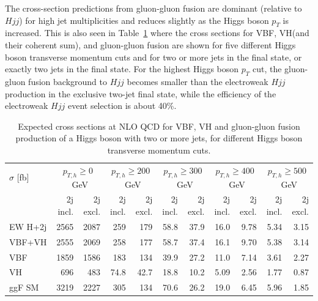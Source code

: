\documentclass[10pt,prd,fleqn,superscriptaddress,notitlepage,nofootinbib,preprintnumbers,nobalancelastpage]{revtex4-1}
\newcommand{\VBF}{VBF\xspace}
\newcommand{\VH}{VH\xspace}
\begin{document}
The cross-section predictions from gluon-gluon fusion are dominant (relative to $Hjj$) for high jet multiplicities and reduces slightly as the Higgs boson $p_T$ is increased.
This is also seen in Table~\ref{tab:incl_njets_fraction} where the cross sections for \VBF, \VH (and their coherent sum), and gluon-gluon fusion are shown for five different Higgs boson transverse momentum cuts and for two or more jets in the final state, or exactly two jets in the final state.
For the highest Higgs boson $p_T$ cut, the gluon-gluon fusion background to $Hjj$ becomes smaller than the electroweak $Hjj$ production in the exclusive two-jet final state, while the efficiency of the electroweak $Hjj$ event selection is about 40\%.

\begin{table}[t]
    \centering
    \bgroup
    \def\arraystretch{1.15}
    \setlength\tabcolsep{3mm}
    \begin{tabular}{l|rrrrrrrrrr}
        $\sigma$ [fb] & \multicolumn{2}{c}{$p_{T,h}\ge0$~GeV} & \multicolumn{2}{c}{$p_{T,h}\ge200$~GeV} & \multicolumn{2}{c}{$p_{T,h}\ge300$~GeV} & \multicolumn{2}{c}{$p_{T,h}\ge400$~GeV} & \multicolumn{2}{c}{$p_{T,h}\ge500$~GeV} \\
        & 2j incl. & 2j excl. & 2j incl. & 2j excl. & 2j incl. & 2j excl. & 2j incl. & 2j excl. & 2j incl. & 2j excl.\\\hline
        EW H+2j & 2565 & 2087 & 259 & 179 & 58.8 & 37.9 & 16.0 & 9.78 & 5.34 & 3.15 \\
        VBF+VH & 2555 & 2069 & 258 & 177 & 58.7 & 37.4 & 16.1 & 9.70 & 5.38 & 3.14 \\
        VBF & 1859 & 1586 & 183 & 134 & 39.9 & 27.2 & 11.0 & 7.14 & 3.61 & 2.27 \\
        VH & 696 & 483 & 74.8 & 42.7 & 18.8 & 10.2 & 5.09 & 2.56 & 1.77 & 0.87 \\
        ggF SM & 3219 & 2227 & 305 & 134 & 70.6 & 26.2 & 19.0 & 6.45 & 5.96 & 1.85
    \end{tabular}
    \egroup
    \caption{Expected cross sections at NLO QCD for \VBF, \VH and gluon-gluon fusion production of a Higgs boson with two or more jets, for different Higgs boson transverse momentum cuts. }
    \label{tab:incl_njets_fraction}
\end{table}
\end{document}
